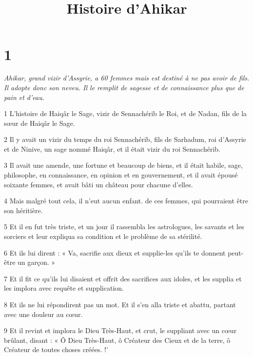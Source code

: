 

\title{Histoire d'Ahikar}

\chapter{1}

\par \textit{Ahikar, grand vizir d'Assyrie, a 60 femmes mais est destiné à ne pas avoir de fils. Il adopte donc son neveu. Il le remplit de sagesse et de connaissance plus que de pain et d'eau.}

\par 1 L'histoire de Haiqâr le Sage, vizir de Sennachérib le Roi, et de Nadan, fils de la sœur de Haiqâr le Sage.

\par 2 Il y avait un vizir du temps du roi Sennachérib, fils de Sarhadum, roi d'Assyrie et de Ninive, un sage nommé Haiqâr, et il était vizir du roi Sennachérib.

\par 3 Il avait une amende, une fortune et beaucoup de biens, et il était habile, sage, philosophe, en connaissance, en opinion et en gouvernement, et il avait épousé soixante femmes, et avait bâti un château pour chacune d'elles.

\par 4 Mais malgré tout cela, il n'eut aucun enfant. de ces femmes, qui pourraient être son héritière.

\par 5 Et il en fut très triste, et un jour il rassembla les astrologues, les savants et les sorciers et leur expliqua sa condition et le problème de sa stérilité.

\par 6 Et ils lui dirent : « Va, sacrifie aux dieux et supplie-les qu'ils te donnent peut-être un garçon. »

\par 7 Et il fit ce qu'ils lui disaient et offrit des sacrifices aux idoles, et les supplia et les implora avec requête et supplication.

\par 8 Et ils ne lui répondirent pas un mot. Et il s'en alla triste et abattu, partant avec une douleur au cœur.

\par 9 Et il revint et implora le Dieu Très-Haut, et crut, le suppliant avec un cœur brûlant, disant : « Ô Dieu Très-Haut, ô Créateur des Cieux et de la terre, ô Créateur de toutes choses créées. !'

